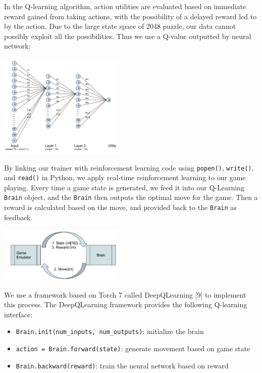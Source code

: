 \documentclass[9pt,twocolumn]{article}
\begin{document}
In the Q-learning algorithm, action utilities are evaluated based on immediate reward gained from taking actions, with the possibility of a delayed reward led to by the action. Due to the large state space of 2048 puzzle, our data cannot possibly exploit all the possibilities. Thus we use a Q-value outputted by neural network:

\begin{centering}

\includegraphics[width=60mm]{rl_nodes.png}

\end{centering}

By linking our trainer with reinforcement learning code using \texttt{popen()}, \texttt{write()}, and \texttt{read()} in Python, we apply real-time reinforcement learning to our game playing. Every time a game state is generated, we feed it into our Q-Learning \texttt{Brain} object, and the \texttt{Brain} then outputs the optimal move for the game. Then a reward is calculated based on the move, and provided back to the \texttt{Brain} as feedback.

\begin{centering}

\includegraphics[width=60mm]{rl_state.png}

\end{centering}

We use a framework based on Torch 7 called DeepQLearning [9] to implement this process. The DeepQLearning framework provides the following Q-learning interface:

\begin{itemize}

\item \texttt{Brain.init(num\_inputs, num\_outputs)}: initialize the brain

\item \texttt{action = Brain.forward(state)}: generate movement based on game state

\item \texttt{Brain.backward(reward)}: train the neural network based on reward

\end{itemize}
\end{document}
